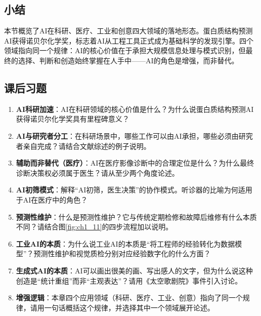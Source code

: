 \bigskip
\subsection*{小结}

本节概览了AI在科研、医疗、工业和创意四大领域的落地形态。蛋白质结构预测AI获得诺贝尔化学奖，标志着AI从工程工具正式成为基础科学的发现引擎。四个领域指向同一个规律：AI的核心价值在于承担大规模信息处理与模式识别，但最终的选择、判断和创造始终掌握在人手中——AI的角色是增强，而非替代。

\bigskip
\subsection*{课后习题}
\begin{enumerate}
\setlength{\itemsep}{6pt}

\item \textbf{AI科研加速}：AI在科研领域的核心价值是什么？为什么说蛋白质结构预测AI获得诺贝尔化学奖具有里程碑意义？

\item \textbf{AI与研究者分工}：在科研场景中，哪些工作可以由AI承担，哪些必须由研究者亲自完成？请结合文献综述的例子说明。

\item \textbf{辅助而非替代（医疗）}：AI在医疗影像诊断中的合理定位是什么？为什么最终诊断决策权必须属于医生？请从至少两个角度论述。

\item \textbf{AI初筛模式}：解释``AI初筛，医生决策''的协作模式。听诊器的比喻为何适用于AI在医疗中的角色？

\item \textbf{预测性维护}：什么是预测性维护？它与传统定期检修和故障后维修有什么本质不同？请结合图\ref{fig:ch1_11}的四步流程加以说明。

\item \textbf{工业AI的本质}：为什么说工业AI的本质是``将工程师的经验转化为数据模型''？预测性维护和视觉质检分别对应经验数字化的什么方面？

\item \textbf{生成式AI的本质}：AI可以画出很美的画、写出感人的文字，但为什么说这种创造是``统计重组''而非``主观表达''？请用《太空歌剧院》事件引入讨论。

\item \textbf{增强逻辑}：本章四个应用领域（科研、医疗、工业、创意）指向了同一个规律，请用一句话概括这个规律，并选择其中一个领域展开论述。

\end{enumerate}


